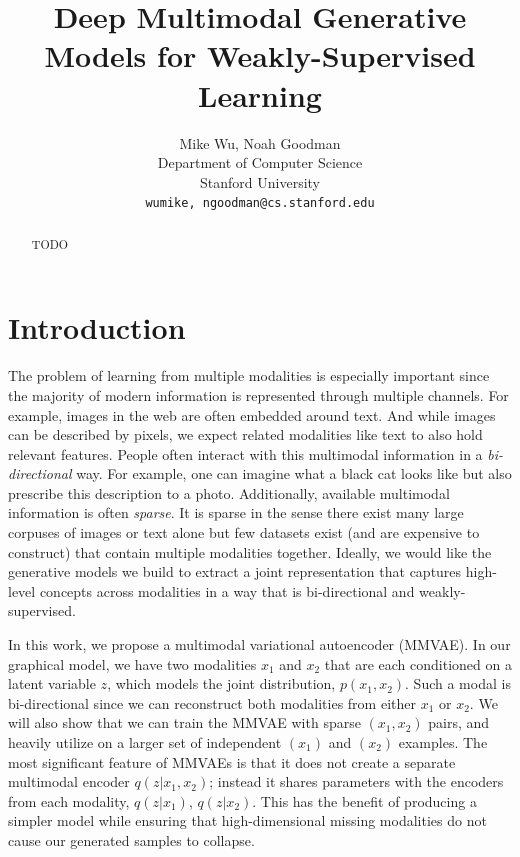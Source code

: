 \documentclass{article}
\title{Deep Multimodal Generative Models for Weakly-Supervised Learning}
\author{
    Mike Wu, Noah Goodman \\
    Department of Computer Science \\
    Stanford University \\
    \texttt{{wumike, ngoodman}@cs.stanford.edu} \\
}
\begin{document}
\maketitle

\begin{abstract}
TODO
\end{abstract}

\section{Introduction}
The problem of learning from multiple modalities is especially important since the majority of modern information is represented through multiple channels. For example, images in the web are often embedded around text. And while images can be described by pixels, we expect related modalities like text to also hold relevant features. People often interact with this multimodal information in a \textit{bi-directional} way. For example, one can imagine what a black cat looks like but also prescribe this description to a photo. Additionally, available multimodal information is often \textit{sparse}. It is sparse in the sense there exist many large corpuses of images or text alone but few datasets exist (and are expensive to construct) that contain multiple modalities together. Ideally, we would like the generative models we build to extract a joint representation that captures high-level concepts across modalities in a way that is bi-directional and weakly-supervised. 

In this work, we propose a multimodal variational autoencoder (MMVAE). In our graphical model, we have two modalities $x_{1}$ and $x_{2}$ that are each conditioned on a latent variable $z$, which models the joint distribution, $p(x_{1}, x_{2})$. Such a modal is bi-directional since we can reconstruct both modalities from either $x_{1}$ or $x_{2}$. We will also show that we can train the MMVAE with sparse $(x_{1}, x_{2})$ pairs, and heavily utilize on a larger set of independent $(x_{1})$ and $(x_{2})$ examples. The most significant feature of MMVAEs is that it does not create a separate multimodal encoder $q(z | x_{1}, x_{2})$; instead it shares parameters with the encoders from each modality, $q(z | x_{1})$, $q(z | x_{2})$. This has the benefit of producing a simpler model while ensuring that high-dimensional missing modalities do not cause our generated samples to collapse.
\end{document}
